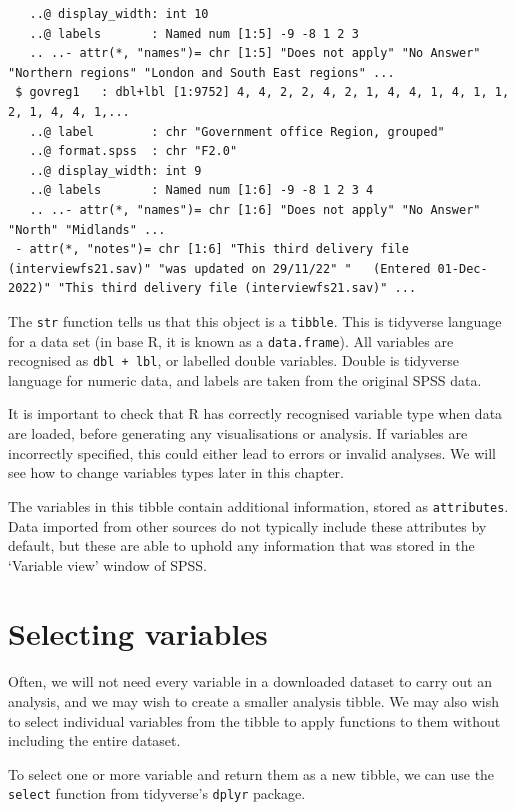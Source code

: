 \documentclass[
  letterpaper,
  DIV=11,
  numbers=noendperiod]{scrreprt}
\begin{document}
\begin{verbatim}
   ..@ display_width: int 10
   ..@ labels       : Named num [1:5] -9 -8 1 2 3
   .. ..- attr(*, "names")= chr [1:5] "Does not apply" "No Answer" "Northern regions" "London and South East regions" ...
 $ govreg1   : dbl+lbl [1:9752] 4, 4, 2, 2, 4, 2, 1, 4, 4, 1, 4, 1, 1, 2, 1, 4, 4, 1,...
   ..@ label        : chr "Government office Region, grouped"
   ..@ format.spss  : chr "F2.0"
   ..@ display_width: int 9
   ..@ labels       : Named num [1:6] -9 -8 1 2 3 4
   .. ..- attr(*, "names")= chr [1:6] "Does not apply" "No Answer" "North" "Midlands" ...
 - attr(*, "notes")= chr [1:6] "This third delivery file (interviewfs21.sav)" "was updated on 29/11/22" "   (Entered 01-Dec-2022)" "This third delivery file (interviewfs21.sav)" ...
\end{verbatim}

The \texttt{str} function tells us that this object is a
\texttt{tibble}. This is tidyverse language for a data set (in base R,
it is known as a \texttt{data.frame}). All variables are recognised as
\texttt{dbl\ +\ lbl}, or labelled double variables. Double is tidyverse
language for numeric data, and labels are taken from the original SPSS
data.

It is important to check that R has correctly recognised variable type
when data are loaded, before generating any visualisations or analysis.
If variables are incorrectly specified, this could either lead to errors
or invalid analyses. We will see how to change variables types later in
this chapter.

The variables in this tibble contain additional information, stored as
\texttt{attributes}. Data imported from other sources do not typically
include these attributes by default, but these are able to uphold any
information that was stored in the `Variable view' window of SPSS.

\section{Selecting variables}\label{selecting-variables}

Often, we will not need every variable in a downloaded dataset to carry
out an analysis, and we may wish to create a smaller analysis tibble. We
may also wish to select individual variables from the tibble to apply
functions to them without including the entire dataset.

To select one or more variable and return them as a new tibble, we can
use the \texttt{select} function from tidyverse's \texttt{dplyr}
package.
\end{document}
